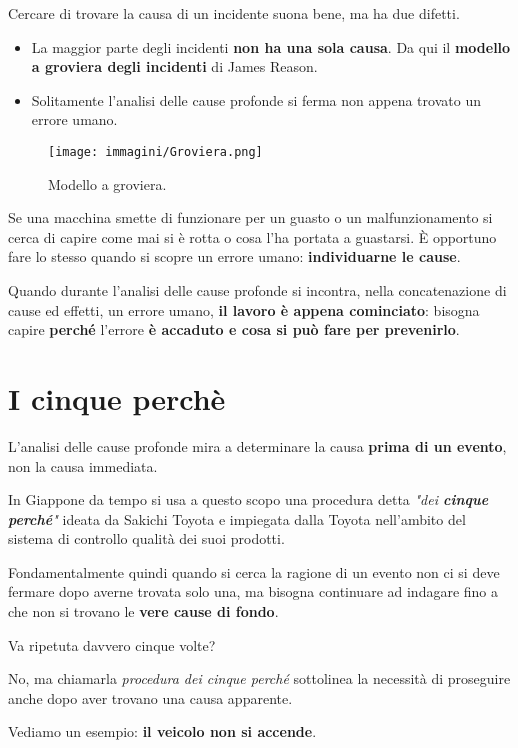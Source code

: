 Cercare di trovare la causa di un incidente suona bene, ma ha due difetti.

\begin{itemize}
	\itemsep-0.3em
	\item La maggior parte degli incidenti \textbf{non ha una sola causa}. Da qui il \textbf{modello a groviera degli incidenti} di James Reason.
	\item Solitamente l'analisi delle cause profonde si ferma non appena trovato un errore umano.
\end{itemize}

\begin{figure}[!ht]
	\centering
	\texttt{[image: immagini/Groviera.png]}
	\caption{Modello a groviera.}
\end{figure}

Se una macchina smette di funzionare per un guasto o un malfunzionamento si cerca di capire come mai si è rotta o cosa l'ha portata a guastarsi. È
opportuno fare lo stesso quando si scopre un errore umano: \textbf{individuarne le cause}.

Quando durante l'analisi delle cause profonde si incontra, nella concatenazione di cause ed effetti, un errore umano, \textbf{il lavoro è appena
cominciato}: bisogna capire \textbf{perché} l'errore \textbf{è accaduto e cosa si può fare per prevenirlo}.

\section{I cinque perchè}

L'analisi delle cause profonde mira a determinare la causa \textbf{prima di un evento}, non la causa immediata.

In Giappone da tempo si usa a questo scopo una procedura detta \textit{"dei \textbf{cinque perché}"} ideata da Sakichi Toyota e impiegata dalla Toyota
nell'ambito del sistema di controllo qualità dei suoi prodotti.

Fondamentalmente quindi quando si cerca la ragione di un evento non ci si deve fermare dopo averne trovata solo una, ma bisogna continuare ad indagare
fino a che non si trovano le \textbf{vere cause di fondo}.

Va ripetuta davvero cinque volte?

No, ma chiamarla \textit{procedura dei cinque perché} sottolinea la necessità di proseguire anche dopo aver trovano una causa apparente.

Vediamo un esempio: \textbf{il veicolo non si accende}.

